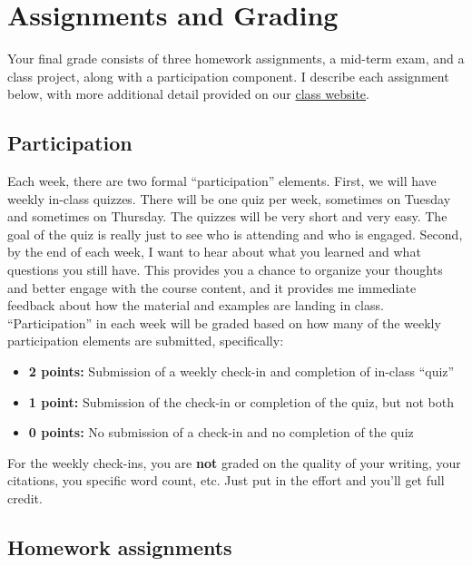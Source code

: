 \documentclass[11pt,]{article}
\providecommand{\tightlist}{%
  \setlength{\itemsep}{0pt}\setlength{\parskip}{0pt}}
\begin{document}
\hypertarget{assignments-and-grading}{%
\section{Assignments and Grading}\label{assignments-and-grading}}

Your final grade consists of three homework assignments, a mid-term
exam, and a class project, along with a participation component. I
describe each assignment below, with more additional detail provided on
our \href{https://econ372s21.classes.ianmccarthyecon.com/}{class
website}.

\hypertarget{participation}{%
\subsection{Participation}\label{participation}}

Each week, there are two formal ``participation'' elements. First, we
will have weekly in-class quizzes. There will be one quiz per week,
sometimes on Tuesday and sometimes on Thursday. The quizzes will be very
short and very easy. The goal of the quiz is really just to see who is
attending and who is engaged. Second, by the end of each week, I want to
hear about what you learned and what questions you still have. This
provides you a chance to organize your thoughts and better engage with
the course content, and it provides me immediate feedback about how the
material and examples are landing in class. ``Participation'' in each
week will be graded based on how many of the weekly participation
elements are submitted, specifically:

\begin{itemize}
\tightlist
\item
  \textbf{2 points:} Submission of a weekly check-in and completion of
  in-class ``quiz''
\item
  \textbf{1 point:} Submission of the check-in or completion of the
  quiz, but not both
\item
  \textbf{0 points:} No submission of a check-in and no completion of
  the quiz
\end{itemize}

For the weekly check-ins, you are \textbf{not} graded on the quality of
your writing, your citations, you specific word count, etc. Just put in
the effort and you'll get full credit.

\hypertarget{homework-assignments}{%
\subsection{Homework assignments}\label{homework-assignments}}
\end{document}

